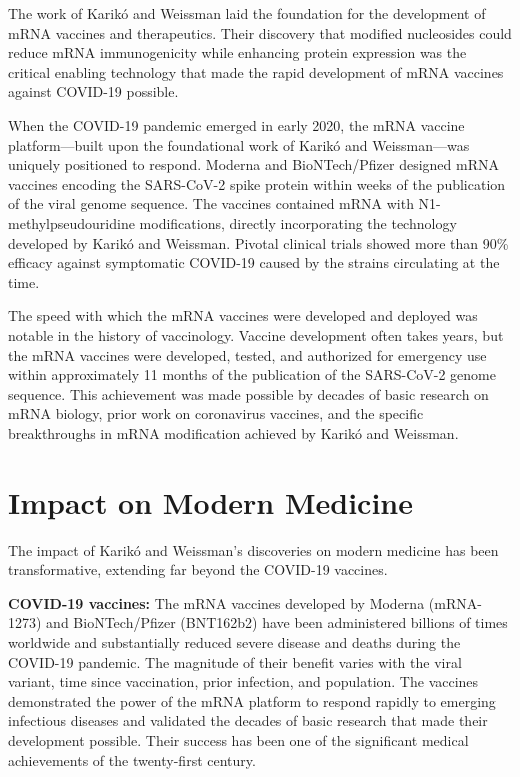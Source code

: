 The work of Karik\'o and Weissman laid the foundation for the development of mRNA vaccines and therapeutics. Their discovery that modified nucleosides could reduce mRNA immunogenicity while enhancing protein expression was the critical enabling technology that made the rapid development of mRNA vaccines against COVID-19 possible.

When the COVID-19 pandemic emerged in early 2020, the mRNA vaccine platform---built upon the foundational work of Karik\'o and Weissman---was uniquely positioned to respond. Moderna and BioNTech/Pfizer designed mRNA vaccines encoding the SARS-CoV-2 spike protein within weeks of the publication of the viral genome sequence. The vaccines contained mRNA with N1-methylpseudouridine modifications, directly incorporating the technology developed by Karik\'o and Weissman. Pivotal clinical trials showed more than 90\% efficacy against symptomatic COVID-19 caused by the strains circulating at the time.

The speed with which the mRNA vaccines were developed and deployed was notable in the history of vaccinology. Vaccine development often takes years, but the mRNA vaccines were developed, tested, and authorized for emergency use within approximately 11 months of the publication of the SARS-CoV-2 genome sequence. This achievement was made possible by decades of basic research on mRNA biology, prior work on coronavirus vaccines, and the specific breakthroughs in mRNA modification achieved by Karik\'o and Weissman.

\section{Impact on Modern Medicine}

The impact of Karik\'o and Weissman's discoveries on modern medicine has been transformative, extending far beyond the COVID-19 vaccines.

\textbf{COVID-19 vaccines:} The mRNA vaccines developed by Moderna (mRNA-1273) and BioNTech/Pfizer (BNT162b2) have been administered billions of times worldwide and substantially reduced severe disease and deaths during the COVID-19 pandemic. The magnitude of their benefit varies with the viral variant, time since vaccination, prior infection, and population. The vaccines demonstrated the power of the mRNA platform to respond rapidly to emerging infectious diseases and validated the decades of basic research that made their development possible. Their success has been one of the significant medical achievements of the twenty-first century.

